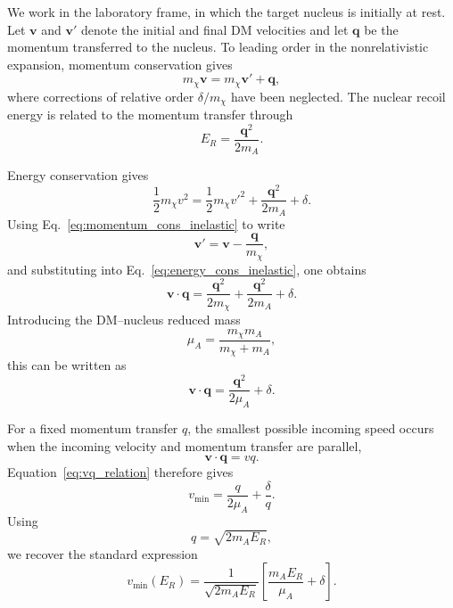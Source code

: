 \documentclass[aps,prd,reprint,superscriptaddress,nofootinbib,longbibliography,floatfix]{revtex4-2}
\begin{document}
We work in the laboratory frame, in which the target nucleus is initially at rest. Let $\bm v$ and $\bm v'$ denote the initial and final DM velocities and let $\bm q$ be the momentum transferred to the nucleus. To leading order in the nonrelativistic expansion, momentum conservation gives
\begin{equation}
m_\chi \bm v
=
m_\chi \bm v'
+
\bm q,
\label{eq:momentum_cons_inelastic}
\end{equation}
where corrections of relative order $\delta/m_\chi$ have been neglected. The nuclear recoil energy is related to the momentum transfer through
\begin{equation}
E_R
=
\frac{\bm q^2}{2m_A}.
\label{eq:ERq}
\end{equation}

Energy conservation gives
\begin{equation}
\frac{1}{2}m_\chi v^2
=
\frac{1}{2}m_\chi v'^2
+
\frac{\bm q^2}{2m_A}
+
\delta.
\label{eq:energy_cons_inelastic}
\end{equation}
Using Eq.~\eqref{eq:momentum_cons_inelastic} to write
\begin{equation}
\bm v'
=
\bm v-\frac{\bm q}{m_\chi},
\end{equation}
and substituting into Eq.~\eqref{eq:energy_cons_inelastic}, one obtains
\begin{equation}
\bm v\cdot\bm q
=
\frac{\bm q^2}{2m_\chi}
+
\frac{\bm q^2}{2m_A}
+
\delta.
\end{equation}
Introducing the DM--nucleus reduced mass
\begin{equation}
\mu_A
=
\frac{m_\chi m_A}{m_\chi+m_A},
\label{eq:mureduced_appendix}
\end{equation}
this can be written as
\begin{equation}
\bm v\cdot\bm q
=
\frac{\bm q^2}{2\mu_A}
+
\delta.
\label{eq:vq_relation}
\end{equation}

For a fixed momentum transfer $q$, the smallest possible incoming speed occurs when the incoming velocity and momentum transfer are parallel,
\begin{equation}
\bm v\cdot\bm q=vq.
\end{equation}
Equation~\eqref{eq:vq_relation} therefore gives
\begin{equation}
v_{\min}
=
\frac{q}{2\mu_A}
+
\frac{\delta}{q}.
\label{eq:vmin_q}
\end{equation}
Using
\begin{equation}
q=\sqrt{2m_AE_R},
\end{equation}
we recover the standard expression
\begin{equation}
v_{\min}(E_R)
=
\frac{1}{\sqrt{2m_AE_R}}
\left[
\frac{m_AE_R}{\mu_A}
+
\delta
\right].
\label{eq:vmin_appendix}
\end{equation}
\end{document}
